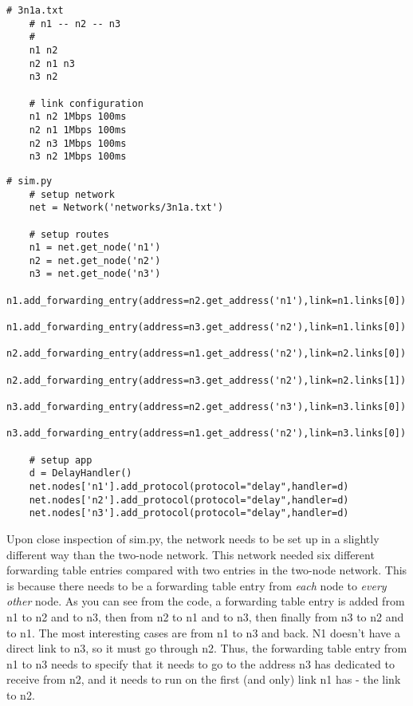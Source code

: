 \documentclass[11pt]{article}
\begin{document}
\vspace{5mm}
\begin{absolutelynopagebreak}
\begin{lstlisting}
# 3n1a.txt
    # n1 -- n2 -- n3
    #
    n1 n2
    n2 n1 n3
    n3 n2

    # link configuration
    n1 n2 1Mbps 100ms
    n2 n1 1Mbps 100ms
    n2 n3 1Mbps 100ms
    n3 n2 1Mbps 100ms
\end{lstlisting}
\end{absolutelynopagebreak}

\vspace{5mm}

\begin{absolutelynopagebreak}
\begin{lstlisting}
# sim.py
    # setup network
    net = Network('networks/3n1a.txt')

    # setup routes
    n1 = net.get_node('n1')
    n2 = net.get_node('n2')
    n3 = net.get_node('n3')
    n1.add_forwarding_entry(address=n2.get_address('n1'),link=n1.links[0])
    n1.add_forwarding_entry(address=n3.get_address('n2'),link=n1.links[0])
    n2.add_forwarding_entry(address=n1.get_address('n2'),link=n2.links[0])
    n2.add_forwarding_entry(address=n3.get_address('n2'),link=n2.links[1])
    n3.add_forwarding_entry(address=n2.get_address('n3'),link=n3.links[0])
    n3.add_forwarding_entry(address=n1.get_address('n2'),link=n3.links[0])

    # setup app
    d = DelayHandler()
    net.nodes['n1'].add_protocol(protocol="delay",handler=d)
    net.nodes['n2'].add_protocol(protocol="delay",handler=d)
    net.nodes['n3'].add_protocol(protocol="delay",handler=d)
\end{lstlisting}
\end{absolutelynopagebreak}
\vspace{5mm}

Upon close inspection of sim.py, the network needs to be set up in a slightly different way than the two-node network. This network needed six different forwarding table entries compared with two entries in the two-node network. This is because there needs to be a forwarding table entry from \emph{each} node to \emph{every other} node. As you can see from the code, a forwarding table entry is added from n1 to n2 and to n3, then from n2 to n1 and to n3, then finally from n3 to n2 and to n1. The most interesting cases are from n1 to n3 and back. N1 doesn't have a direct link to n3, so it must go through n2. Thus, the forwarding table entry from n1 to n3 needs to specify that it needs to go to the address n3 has dedicated to receive from n2, and it needs to run on the first (and only) link n1 has - the link to n2.
\end{document}
